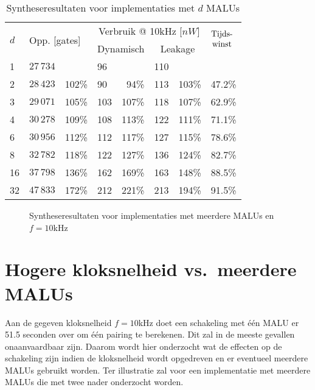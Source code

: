 \begin{table}[h]
	\caption{Syntheseresultaten voor implementaties met $d$ MALUs}
	\label{tabel-resultaten-md}

	\centering
	\begin{tabular}{llrlrlrl}
		\toprule
		\multirow{2}{*}{$d$} & \multicolumn{2}{l}{\multirow{2}{*}{Opp. [gates]}}	& \multicolumn{4}{c}{Verbruik @ 10kHz [$nW$]}	& \multirow{2}{*}{$\begin{array}{@{}c@{}}\text{Tijds-}\\\text{winst}\end{array}$}\\
		\cmidrule{4-7}
		&	& & \multicolumn{2}{c}{Dynamisch}	& \multicolumn{2}{c}{Leakage}	&\\
		\midrule
		1			& $27\,734$	& 			& 96	& 			& 110	& 			& \\
		2			& $28\,423$	& 102\%	& 90	& 94\%	& 113	& 103\%	& 47.2\%\\
		3			& $29\,071$	& 105\%	& 103	& 107\%	& 118	& 107\%	& 62.9\%\\
		4			& $30\,278$	& 109\%	& 108	& 113\%	& 122	& 111\%	& 71.1\%\\
		6			& $30\,956$	& 112\%	& 112	& 117\%	& 127	& 115\%	& 78.6\%\\
		8			& $32\,782$	& 118\%	& 122	& 127\%	& 136	& 124\%	& 82.7\%\\
		16			& $37\,798$	& 136\%	& 162	& 169\%	& 163	& 148\%	& 88.5\%\\
		32			& $47\,833$	& 172\%	& 212	& 221\%	& 213	& 194\%	& 91.5\%\\
		\hline		
	\end{tabular}
\end{table}

\begin{figure}[h]
	\centering
		\caption{Syntheseresultaten voor implementaties met meerdere MALUs en $f = 10$kHz\label{figuur-resultaten-md}}
\end{figure}

\section{Hogere kloksnelheid vs.\ meerdere MALUs}

Aan de gegeven kloksnelheid $f = 10$kHz doet een schakeling met \'e\'en MALU er 51.5 seconden over om \'e\'en pairing te berekenen. Dit zal  in de meeste gevallen onaanvaardbaar zijn. Daarom wordt hier onderzocht wat de effecten op de schakeling zijn indien de kloksnelheid wordt opgedreven en er eventueel meerdere MALUs gebruikt worden. Ter illustratie zal voor een implementatie met meerdere MALUs die met twee nader onderzocht worden.

